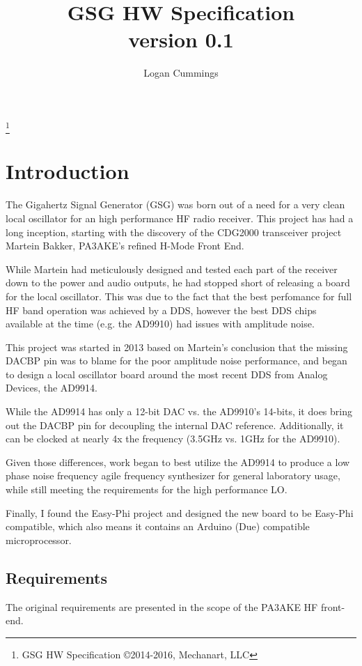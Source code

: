 \documentclass[letterpaper,12pt]{article}
\title{GSG HW Specification \\ \vspace{2 mm} {\large version 0.1}}
\author{Logan Cummings}
\begin{document}
\maketitle
\renewcommand*\footnoterule{}
\let\thefootnote\relax\footnote{GSG \hfill HW Specification  \hfill {\copyright{2014-2016, Mechanart, LLC}}}
\newpage
\tableofcontents

\section{Introduction}

The Gigahertz Signal Generator (GSG) was born out of a need for a very clean 
local oscillator for an high performance HF radio receiver. This project 
has had a long inception, starting with the discovery of the CDG2000 
transceiver project Martein Bakker, PA3AKE's refined H-Mode Front End.
\par 
While Martein had meticulously designed and tested each part of the receiver 
down to the power and audio outputs, he had stopped short of releasing a 
board for the local oscillator. This was due to the fact that the best perfomance 
for full  HF band operation was achieved by a DDS, however the best DDS chips
available at the time (e.g. the AD9910) had issues with amplitude noise.
\par
This project was started in 2013 based on Martein's conclusion that the missing 
DACBP pin was to blame for the poor amplitude noise performance, and began to 
design a local oscillator board around the most recent DDS from Analog Devices, 
the AD9914.
\par
While the AD9914 has only a 12-bit DAC vs. the AD9910's 14-bits, it does bring
out the DACBP pin for decoupling the internal DAC reference. Additionally, it 
can be clocked at nearly 4x the frequency (3.5GHz vs. 1GHz for the AD9910). 
\par
Given those differences, work began to best utilize the AD9914 to produce a 
low phase noise frequency agile frequency synthesizer for general laboratory 
usage, while still meeting the requirements for the high performance LO.
\par
Finally, I found the Easy-Phi project and designed the new board to 
be Easy-Phi compatible, which also means it contains an Arduino (Due) compatible 
microprocessor.

\subsection{Requirements}
The original requirements are presented in the scope of the PA3AKE HF 
front-end.
\end{document}
